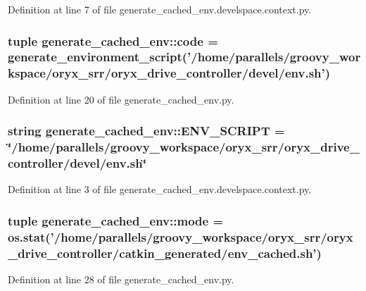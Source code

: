 \-Definition at line 7 of file generate\-\_\-cached\-\_\-env.\-develspace.\-context.\-py.

\subsubsection[{code}]{\setlength{\rightskip}{0pt plus 5cm}tuple {\bf generate\-\_\-cached\-\_\-env\-::code} = generate\-\_\-environment\-\_\-script('/home/parallels/groovy\-\_\-workspace/oryx\-\_\-srr/oryx\-\_\-drive\-\_\-controller/devel/env.\-sh')}\label{namespacegenerate__cached__env_ac9bcc622d7ed9c3f04f958d98feb15a2}


\-Definition at line 20 of file generate\-\_\-cached\-\_\-env.\-py.

\subsubsection[{\-E\-N\-V\-\_\-\-S\-C\-R\-I\-P\-T}]{\setlength{\rightskip}{0pt plus 5cm}string {\bf generate\-\_\-cached\-\_\-env\-::\-E\-N\-V\-\_\-\-S\-C\-R\-I\-P\-T} = \char`\"{}/home/parallels/groovy\-\_\-workspace/oryx\-\_\-srr/oryx\-\_\-drive\-\_\-controller/devel/env.\-sh\char`\"{}}\label{namespacegenerate__cached__env_a47f2ffa8bf91a11f8c1a26fd677ae040}


\-Definition at line 3 of file generate\-\_\-cached\-\_\-env.\-develspace.\-context.\-py.

\subsubsection[{mode}]{\setlength{\rightskip}{0pt plus 5cm}tuple {\bf generate\-\_\-cached\-\_\-env\-::mode} = os.\-stat('/home/parallels/groovy\-\_\-workspace/oryx\-\_\-srr/oryx\-\_\-drive\-\_\-controller/catkin\-\_\-generated/env\-\_\-cached.\-sh')}\label{namespacegenerate__cached__env_a5d4820d9a2d43523818b8013aba84965}


\-Definition at line 28 of file generate\-\_\-cached\-\_\-env.\-py.

